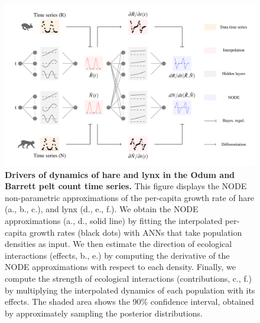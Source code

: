 \documentclass[11pt, oneside]{article}
\begin{document}
\newpage
\begin{figure}[H]
\begin{center}
\includegraphics[width=\linewidth,page=4]{figures/main.pdf}
\caption{
    \textbf{Drivers of dynamics of hare and lynx in the Odum and Barrett pelt count time series.}
    This figure displays the NODE non-parametric approximations of the per-capita growth rate of hare (a., b., c.), and lynx (d., e., f.).
    We obtain the NODE approximations (a., d., solid line) by fitting the interpolated per-capita growth rates (black dots) with ANNs that take population densities as input.
    We then estimate the direction of ecological interactions (effects, b., e.) by computing the derivative of the NODE approximations with respect to each density.
    Finally, we compute the strength of ecological interactions (contributions, c., f.) by multiplying the interpolated dynamics of each population with its effects.
    The shaded area shows the 90\% confidence interval, obtained by approximately sampling the posterior distributions. 
}
\end{center}
\end{figure}
\newpage
\end{document}
